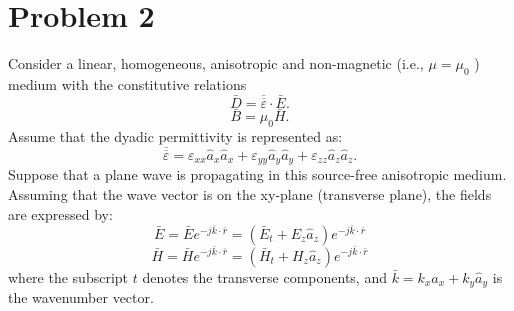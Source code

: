 \documentclass[11pt]{amsart}
\begin{document}
\section*{Problem 2 }
Consider a linear, homogeneous, anisotropic and non-magnetic (i.e., $\mu=\mu_0$ ) medium with the
constitutive relations
\begin{equation*}
\bar{D}=\overline{\overline{\varepsilon}}\cdot \bar{E}.
\end{equation*}
\begin{equation*}
\bar{B}=\mu_0 \bar{H}.
\end{equation*}
Assume that the dyadic permittivity is represented as:
\begin{equation*}
\overline{\overline{\varepsilon}}=\varepsilon_{xx}\hat{a}_x \hat{a}_x +\varepsilon_{yy}\hat{a}_y \hat{a}_y +\varepsilon_{zz}\hat{a}_z \hat{a}_z. 
\end{equation*}
Suppose that a plane wave is propagating in this source-free anisotropic medium. Assuming that the
wave vector is on the xy-plane (transverse plane), the fields are expressed by:
\begin{equation*}
\bar{E}=\bar{E}e^{-j \bar{k} \cdot \bar{r}}=(\bar{E}_t+E_z \hat{a}_z)e^{-j \bar{k} \cdot \bar{r}}
\end{equation*}
\begin{equation*}
\bar{H}=\bar{H}e^{-j \bar{k} \cdot \bar{r}}=(\bar{H}_t+H_z \hat{a}_z)e^{-j \bar{k} \cdot \bar{r}}
\end{equation*}
where the subscript $t$ denotes the transverse components, and $\bar{k}=k_x \hat{a}_x+k_y \hat{a}_y$ is the wavenumber vector.
\end{document}
